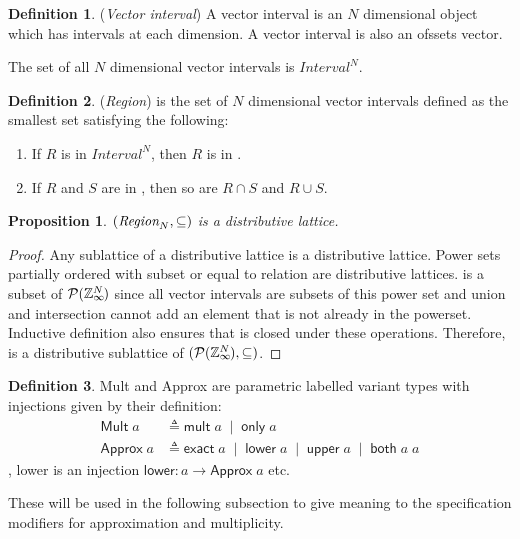 \documentclass[acmlarge,review]{acmart}
\theoremstyle{definition}
\newtheorem{defn}{Definition}
\theoremstyle{plain}
\newtheorem{prop}{Proposition}
\theoremstyle{remark}
\begin{document}
\begin{defn}{(\emph{Vector interval})}
  A vector interval is an $N$ dimensional object which has \zinf{} intervals at
  each dimension. A vector interval is also an ofssets vector.

  The set of all $N$ dimensional vector intervals is $\textit{Interval}^N$.
\end{defn}

\begin{defn}{(\emph{Region})}
   is the set of $N$ dimensional vector intervals defined as
  the smallest set satisfying the following:
%
  \begin{enumerate}
    \item If $R$ is in $\textit{Interval}^N$, then $R$ is in .
    \item If $R$ and $S$ are in , then so are $R \cap S$ and
      $R \cup S$.
  \end{enumerate}
\end{defn}

\begin{prop}{}
  $(\textnormal{$\textit{Region}_{N}$},\subseteq)$ is a distributive lattice.
\end{prop}
%
\begin{proof}
  Any sublattice of a distributive lattice is a distributive lattice. Power sets
  partially ordered with subset or equal to relation are distributive lattices.
   is a subset of $\mathcal{P}{(\textnormal{$\mathbb{Z}_\infty$}{}^{\mkern-19mu{N}})}$ since all
  vector intervals are subsets of this power set and union and intersection
  cannot add an element that is not already in the powerset.  Inductive
  definition also ensures that  is closed under these operations.
  Therefore,  is a distributive sublattice of
  $(\mathcal{P}{(\textnormal{$\mathbb{Z}_\infty$}{}^{\mkern-19mu{N}})}, \subseteq)$.
\end{proof}

\begin{defn}{}
  \textsf{Mult} and \textsf{Approx} are parametric labelled variant types with
  injections given by their definition:
%
  \begin{align*}
    \textsf{Mult} \; a &
      \triangleq \textsf{mult} \; a \;\mid\; \textsf{only} \; a \\
    \textsf{Approx} \; a &
      \triangleq \textsf{exact} \; a \;\mid\; \textsf{lower} \; a \;\mid\;
        \textsf{upper} \; a \;\mid\; \textsf{both} \; a \; a
  \end{align*}
%
  \eg{}, \textsf{lower} is an injection $\mathsf{lower} : a \to \mathsf{Approx}
  \; a$ etc.

  These will be used in the following subsection to give meaning to the
  specification modifiers for approximation and multiplicity.
\end{defn}
\end{document}
